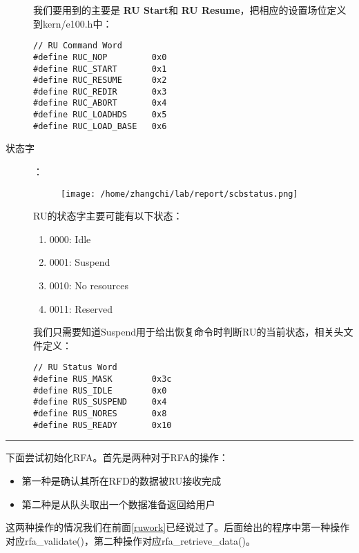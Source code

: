 \documentclass{article}
\newcommand{\highlight}[1]{{\bfseries \color{red}  #1}}
\newcommand{\funcname}[1]{{\ttfamily \small #1}}
\begin{document}
\begin{CJK*}{UTF8}{gkai}
\begin{description}
我们要用到的主要是\highlight{RU Start}和\highlight{RU Resume}，把相应的设置场位定义到kern/e100.h中：

\begin{lstlisting}[style=ccode, title={\scriptsize \ttfamily \bfseries kern/e100.h}]
// RU Command Word
#define RUC_NOP         0x0
#define RUC_START       0x1
#define RUC_RESUME      0x2
#define RUC_REDIR       0x3
#define RUC_ABORT       0x4
#define RUC_LOADHDS     0x5
#define RUC_LOAD_BASE   0x6
\end{lstlisting}


\item[状态字]：\\
\begin{figure}[htp]
\centering
\texttt{[image: /home/zhangchi/lab/report/scbstatus.png]}
\end{figure}

RU的状态字主要可能有以下状态：

\begin{enumerate}
\item{0000: Idle}
\item{0001: Suspend}
\item{0010: No resources}
\item{0011: Reserved}
\end{enumerate}

我们只需要知道Suspend用于给出恢复命令时判断RU的当前状态，相关头文件定义：

\begin{lstlisting}[style=ccode, title={\scriptsize \ttfamily \bfseries kern/e100.h}]
// RU Status Word
#define RUS_MASK        0x3c
#define RUS_IDLE        0x0
#define RUS_SUSPEND     0x4
#define RUS_NORES       0x8
#define RUS_READY       0x10
\end{lstlisting}

\end{description}

\vspace{2em}
\hrule
\vspace{2em}

下面尝试初始化RFA。首先是两种对于RFA的操作：
\begin{itemize}
\item{第一种是确认其所在RFD的数据被RU接收完成}
\item{第二种是从队头取出一个数据准备返回给用户}
\end{itemize}

这两种操作的情况我们在前面\ref{ruwork}已经说过了。后面给出的程序中第一种操作对应\funcname{rfa\_validate()}，第二种操作对应\funcname{rfa\_retrieve\_data()}。


\end{CJK*}
\end{document}

